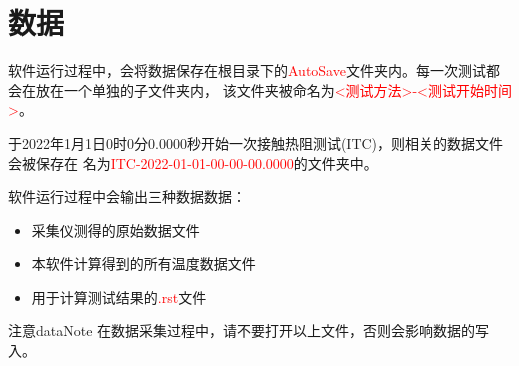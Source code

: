 \section{数据}

软件运行过程中，会将数据保存在根目录下的\textcolor{red}{AutoSave}文件夹内。每一次测试都会在放在一个单独的子文件夹内，
该文件夹被命名为\textcolor{red}{<测试方法>-<测试开始时间>}。
\begin{example}
    于2022年1月1日0时0分0.0000秒开始一次接触热阻测试(ITC)，则相关的数据文件会被保存在
    名为\textcolor{red}{ITC-2022-01-01-00-00-00.0000}的文件夹中。
\end{example}
软件运行过程中会输出三种数据数据：
\begin{itemize}
    \item 采集仪测得的原始数据文件
    \item 本软件计算得到的所有温度数据文件
    \item 用于计算测试结果的\textcolor{red}{.rst}文件
\end{itemize}
\begin{tips}{注意}{dataNote}
    在数据采集过程中，请不要打开以上文件，否则会影响数据的写入。
\end{tips}
